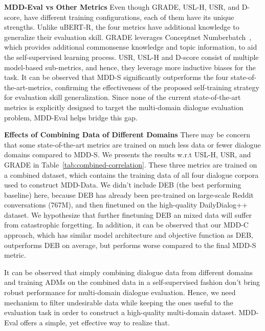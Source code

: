 \documentclass[letterpaper]{article} \usepackage{aaai22}  \usepackage{times}  \usepackage{helvet}  \usepackage{courier}  \usepackage[hyphens]{url}  \usepackage{graphicx} \urlstyle{rm} \def\UrlFont{\rm}  \usepackage{natbib}  \usepackage{caption} \DeclareCaptionStyle{ruled}{labelfont=normalfont,labelsep=colon,strut=off} \frenchspacing  \setlength{\pdfpagewidth}{8.5in}  \setlength{\pdfpageheight}{11in}  \usepackage{algorithm}
\begin{document}
\bigskip
\noindent\textbf{MDD-Eval vs Other Metrics } Even though GRADE, USL-H, USR, and D-score, have different training configurations, each of them have its unique strengths. Unlike uBERT-R, the four metrics have additional knowledge to generalize their evaluation skill. GRADE leverages Conceptnet Numberbatch~\citep{speer2017conceptnet}, which provides additional commonsense knowledge and topic information, to aid the self-supervised learning process. USR, USL-H and D-score consist of multiple model-based sub-metrics, and hence, they leverage more inductive biases for the task. It can be observed that MDD-S significantly outperforms the four state-of-the-art-metrics, confirming the effectiveness of the proposed self-training strategy for evaluation skill generalization. Since none of the current state-of-the-art metrics is explicitly designed to target the multi-domain dialogue evaluation problem, MDD-Eval helps bridge this gap.  

\bigskip
\noindent\textbf{Effects of Combining Data of Different Domains }There may be concern that some state-of-the-art metrics are trained on much less data or fewer dialogue domains compared to MDD-S. We presents the results w.r.t USL-H, USR, and GRADE in Table~\ref{tab:combined-correlation}. These three metrics are trained on a combined dataset, which contains the training data of all four dialogue corpora used to construct MDD-Data. We didn't include DEB (the best performing baseline) here, because DEB has already been pre-trained on large-scale Reddit conversations (767M), and then finetuned on the high-quality DailyDialog++ dataset. We hypothesize that further finetuning DEB an mixed data will suffer from catastrophic forgetting. In addition, it can be observed that our MDD-C approach, which has similar model architecture and objective function as DEB, outperforms DEB on average, but performs worse compared to the final MDD-S metric. 

 It can be observed that simply combining dialogue data from different domains and training ADMs on the combined data in a self-supervised fashion don't bring robust performance for multi-domain dialogue evaluation. Hence, we need mechanism to filter undesirable data while keeping the ones useful to the evaluation task in order to construct a high-quality multi-domain dataset. MDD-Eval offers a simple, yet effective way to realize that.   
\end{document}
